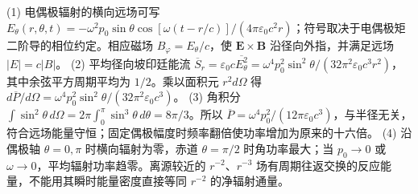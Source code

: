 (1) 电偶极辐射的横向远场可写 \(E_\theta(r,\theta,t)=-\omega^2p_0\sin\theta\cos[\omega(t-r/c)]/(4\pi\varepsilon_0c^2r)\)；符号取决于电偶极矩二阶导的相位约定。相应磁场 \(B_\varphi=E_\theta/c\)，使 \(\mathbf E\times\mathbf B\) 沿径向外指，并满足远场 \(|E|=c|B|\)。
(2) 平均径向坡印廷能流 \(\overline S_r=\varepsilon_0c\overline{E_\theta^2}=\omega^4p_0^2\sin^2\theta/(32\pi^2\varepsilon_0c^3r^2)\)，其中余弦平方周期平均为 \(1/2\)。乘以面积元 \(r^2d\Omega\) 得 \(d\overline P/d\Omega=\omega^4p_0^2\sin^2\theta/(32\pi^2\varepsilon_0c^3)\)。
(3) 角积分 \(\int\sin^2\theta\,d\Omega=2\pi\int_0^\pi\sin^3\theta\,d\theta=8\pi/3\)。所以 \(\overline P=\omega^4p_0^2/(12\pi\varepsilon_0c^3)\)，与半径无关，符合远场能量守恒；固定偶极幅度时频率翻倍使功率增加为原来的十六倍。
(4) 沿偶极轴 \(\theta=0,\pi\) 时横向辐射为零，赤道 \(\theta=\pi/2\) 时角功率最大；当 \(p_0\to0\) 或 \(\omega\to0\)，平均辐射功率趋零。离源较近的 \(r^{-2}\)、\(r^{-3}\) 场有周期往返交换的反应能量，不能用其瞬时能量密度直接等同 \(r^{-2}\) 的净辐射通量。
